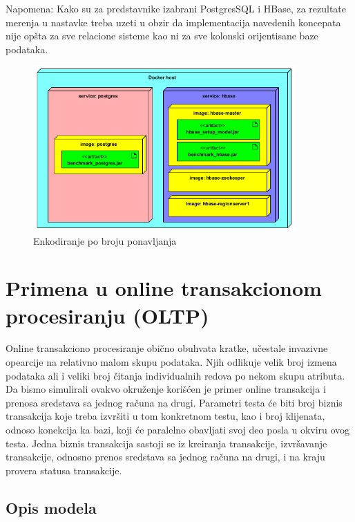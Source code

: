 \documentclass[12pt,oneside]{memoir}
\begin{document}
Napomena: Kako su za predstavnike izabrani PostgresSQL i HBase,  za rezultate merenja u nastavke treba uzeti u obzir da implementacija navedenih koncepata nije opšta za sve relacione sisteme kao ni za sve kolonski orijentisane baze podataka.


\begin{figure}[!ht]
  \centering
  \includegraphics[width=0.9\textwidth]{deployment_diagram.png}
  \caption{Enkodiranje po broju ponavljanja}
  \label{fig:grafikon}
\end{figure}

\pagebreak

\section{Primena u online transakcionom procesiranju (OLTP)}

Online transakciono procesiranje obično obuhvata kratke, učestale invazivne opearcije na relativno malom skupu podataka. Njih odlikuje velik broj izmena podataka ali i veliki broj čitanja individualnih redova po nekom skupu atributa. Da bismo simulirali ovakvo okruženje korišćen je primer online transakcija i prenosa sredstava sa jednog računa na drugi. Parametri testa će biti broj biznis transakcija koje treba izvršiti u tom konkretnom testu, kao i broj klijenata, odnoso konekcija ka bazi, koji će paralelno obavljati svoj deo posla u okviru ovog testa. Jedna biznis transakcija sastoji se iz kreiranja transakcije, izvršavanje transakcije, odnosno prenos sredstava sa jednog računa na drugi, i na kraju provera statusa transakcije. 


\subsection{Opis modela}
\end{document}
